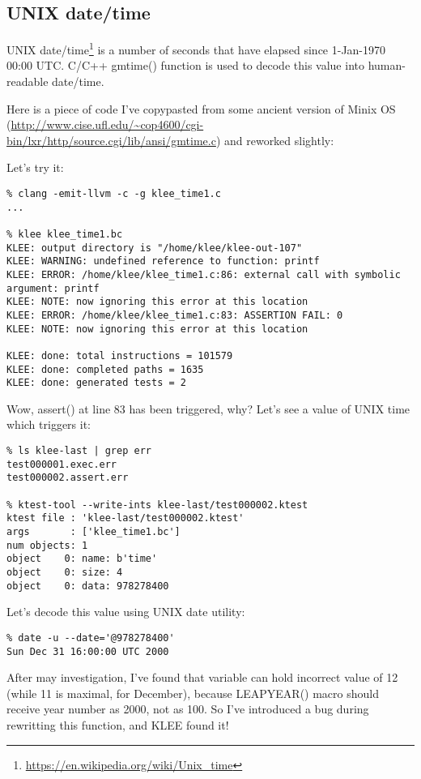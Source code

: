 \subsection{UNIX date/time}

UNIX date/time\footnote{\url{https://en.wikipedia.org/wiki/Unix_time}} is a number of seconds that have elapsed since 1-Jan-1970 00:00 UTC.
C/C++ gmtime() function is used to decode this value into human-readable date/time.

Here is a piece of code I've copypasted from some ancient version of Minix OS 
(\url{http://www.cise.ufl.edu/~cop4600/cgi-bin/lxr/http/source.cgi/lib/ansi/gmtime.c}) and reworked slightly:



Let's try it:

\begin{lstlisting}
% clang -emit-llvm -c -g klee_time1.c
...

% klee klee_time1.bc
KLEE: output directory is "/home/klee/klee-out-107"
KLEE: WARNING: undefined reference to function: printf
KLEE: ERROR: /home/klee/klee_time1.c:86: external call with symbolic argument: printf
KLEE: NOTE: now ignoring this error at this location
KLEE: ERROR: /home/klee/klee_time1.c:83: ASSERTION FAIL: 0
KLEE: NOTE: now ignoring this error at this location

KLEE: done: total instructions = 101579
KLEE: done: completed paths = 1635
KLEE: done: generated tests = 2
\end{lstlisting}

Wow, assert() at line 83 has been triggered, why?
Let's see a value of UNIX time which triggers it:

\begin{lstlisting}
% ls klee-last | grep err
test000001.exec.err
test000002.assert.err

% ktest-tool --write-ints klee-last/test000002.ktest
ktest file : 'klee-last/test000002.ktest'
args       : ['klee_time1.bc']
num objects: 1
object    0: name: b'time'
object    0: size: 4
object    0: data: 978278400
\end{lstlisting}

Let's decode this value using UNIX date utility:

\begin{lstlisting}
% date -u --date='@978278400'
Sun Dec 31 16:00:00 UTC 2000
\end{lstlisting}

After may investigation, I've found that  variable can hold incorrect value of 12 (while 11 is maximal, for December), 
because LEAPYEAR() macro should receive year number as 2000, not as 100.
So I've introduced a bug during rewritting this function, and KLEE found it!

